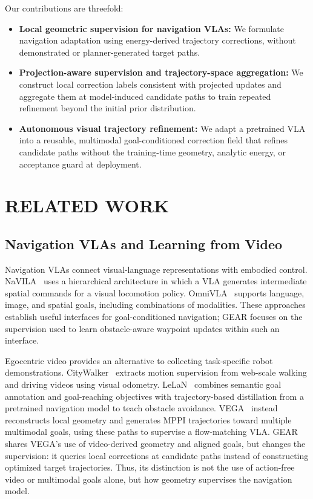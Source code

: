 \documentclass[letterpaper, 10 pt, conference]{ieeeconf}  %
\begin{document}
Our contributions are threefold:
\begin{itemize}
    \item \textbf{Local geometric supervision for navigation VLAs:}
    We formulate navigation adaptation using energy-derived trajectory
    corrections, without demonstrated or planner-generated target paths.

    \item \textbf{Projection-aware supervision and trajectory-space
    aggregation:} We construct local correction labels consistent with
    projected updates and aggregate them at model-induced candidate paths
    to train repeated refinement beyond the initial prior distribution.

    \item \textbf{Autonomous visual trajectory refinement:} We adapt a
    pretrained VLA into a reusable, multimodal goal-conditioned correction
    field that refines candidate paths without the training-time geometry,
    analytic energy, or acceptance guard at deployment.
\end{itemize}


\section{RELATED WORK}
\label{sec:related_work}

\subsection{Navigation VLAs and Learning from Video}

Navigation VLAs connect visual-language representations with embodied
control. NaVILA~\cite{navila} uses a hierarchical architecture in which a
VLA generates intermediate spatial commands for a visual locomotion
policy. OmniVLA~\cite{omnivla} supports language, image, and spatial goals,
including combinations of modalities. These approaches establish useful
interfaces for goal-conditioned navigation; GEAR focuses on the
supervision used to learn obstacle-aware waypoint updates within such an
interface.

Egocentric video provides an alternative to collecting task-specific robot
demonstrations. CityWalker~\cite{citywalker} extracts motion supervision
from web-scale walking and driving videos using visual odometry.
LeLaN~\cite{lelan} combines semantic goal annotation and goal-reaching
objectives with trajectory-based distillation from a pretrained navigation
model to teach obstacle avoidance. VEGA~\cite{vega} instead reconstructs
local geometry and generates MPPI trajectories toward multiple multimodal
goals, using these paths to supervise a flow-matching VLA. GEAR shares
VEGA's use of video-derived geometry and aligned goals, but changes the
supervision: it queries local corrections at candidate paths instead of
constructing optimized target trajectories. Thus, its distinction is not
the use of action-free video or multimodal goals alone, but how geometry
supervises the navigation model.
\end{document}
